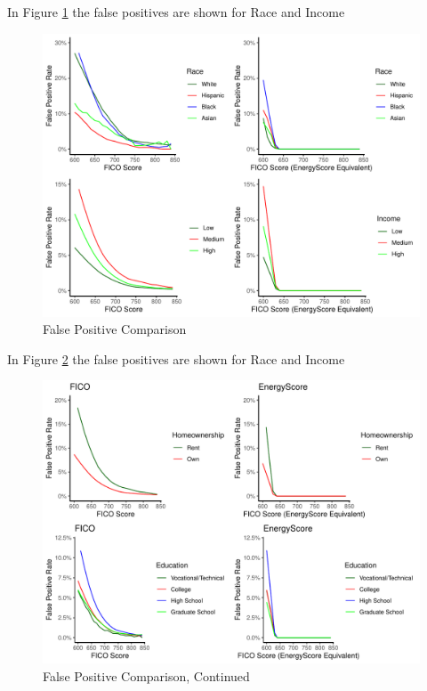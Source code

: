 \documentclass[11pt,]{article}
\begin{document}
In Figure \ref{fig:fprace} the false positives are shown for Race and
Income

\begin{figure}
\centering
\includegraphics{figs/fprace.pdf}
\caption{\label{fig:fprace}False Positive Comparison}
\end{figure}

In Figure \ref{fig:fprace2} the false positives are shown for Race and
Income

\begin{figure}
\centering
\includegraphics{figs/fprace2.pdf}
\caption{\label{fig:fprace2}False Positive Comparison, Continued}
\end{figure}
\end{document}
